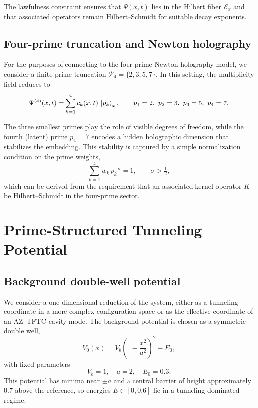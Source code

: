 \documentclass[11pt]{article}
\begin{document}
The lawfulness constraint ensures that \(\Psi(x,t)\) lies in the Hilbert
fiber \(\mathcal{E}_x\) and that associated operators remain
Hilbert--Schmidt for suitable decay exponents.\cite{tunneling_topology_draft}

\subsection{Four-prime truncation and Newton holography}

For the purposes of connecting to the four-prime Newton holography
model, we consider a finite-prime truncation
\(\mathcal{P}_4 = \{2,3,5,7\}\). In this setting, the multiplicity field
reduces to
\begin{equation}
  \Psi^{(4)}(x,t) = \sum_{k=1}^{4} c_k(x,t)\, \ket{p_k}_x,
  \qquad p_1=2,\ p_2=3,\ p_3=5,\ p_4=7.
\end{equation}

The three smallest primes play the role of visible degrees of freedom,
while the fourth (latent) prime \(p_4=7\) encodes a hidden holographic
dimension that stabilizes the embedding.\cite{newton_holography_draft}
This stability is captured by a simple normalization condition on the
prime weights,
\begin{equation}
  \sum_{k=1}^{4} w_k\,p_k^{-\sigma} = 1,
  \qquad \sigma > \tfrac{1}{2},
  \label{eq:closure_condition}
\end{equation}
which can be derived from the requirement that an associated kernel
operator \(K\) be Hilbert--Schmidt in the four-prime sector.\cite{newton_holography_draft}

\section{Prime-Structured Tunneling Potential}

\subsection{Background double-well potential}

We consider a one-dimensional reduction of the system, either as a
tunneling coordinate in a more complex configuration space or as the
effective coordinate of an AZ--TFTC cavity mode.\cite{tunneling_topology_draft}
The background potential is chosen as a symmetric double well,
\begin{equation}
  V_0(x) = V_b\left(1 - \frac{x^2}{a^2}\right)^2 - E_0,
  \label{eq:double_well}
\end{equation}
with fixed parameters
\begin{equation}
  V_b = 1,\quad a = 2,\quad E_0 = 0.3.
\end{equation}
This potential has minima near \(\pm a\) and a central barrier of
height approximately \(0.7\) above the reference, so energies
\(E\in[0,0.6]\) lie in a tunneling-dominated regime.
\end{document}
